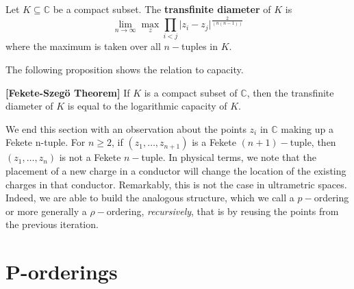 \begin{definition}
Let $K \subseteq \mathbb{C}$ be a compact subset. The \textbf{transfinite diameter} of $K$ is \[ \lim_{n\to\infty}\max_z  \prod_{i < j} \lvert z_i - z_j \rvert^{\frac{2}{(n(n-1))}}\] where the maximum is taken over all $n-$tuples in $K$. 
\end{definition}

The following proposition shows the relation to capacity.\\

\begin{proposition}
\textbf{[Fekete-Szeg\"o Theorem]} If $K$ is a compact subset of $\mathbb{C}$, then the transfinite diameter of $K$ is equal to the logarithmic capacity of $K$.
\end{proposition}



We end this section with an observation about the points $z_i$ in $\mathbb{C}$ making up a Fekete n-tuple. For $n \geq 2$, if $(z_1,\ldots,z_{n+1})$ is a Fekete $(n+1)-$tuple, then $(z_1,\ldots,z_n)$ is not a Fekete $n-$tuple. In physical terms, we note that the placement of a new charge in a conductor will change the location of the existing charges in that conductor. Remarkably, this is not the case in ultrametric spaces. Indeed, we are able to build the analogous structure, which we call a $p-$ordering or more generally a $\rho-$ordering, \textit{recursively}, that is by reusing the points from the previous iteration. 

\section{P-orderings}

